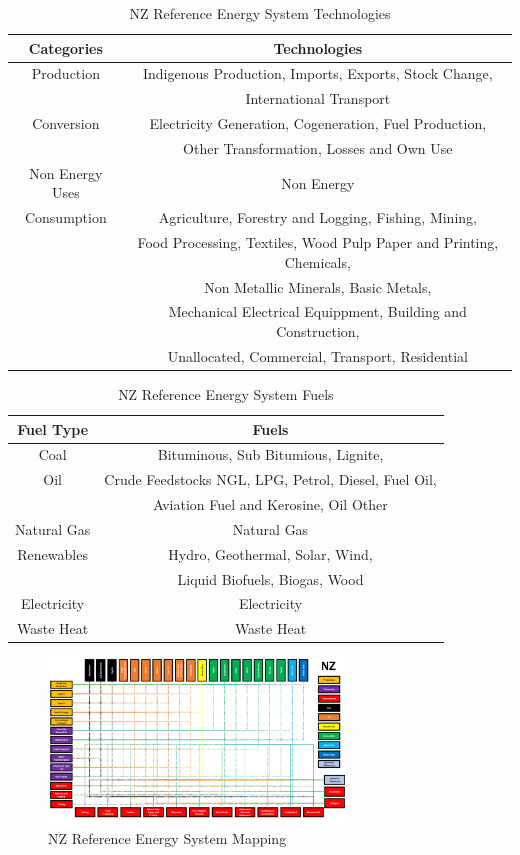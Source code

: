 \documentclass[12pt]{article}
\begin{document}
\begin{table}[H]
	\centering
	\begin{tabular}{||c | c||} 
	 \hline
	 Categories & Technologies \\ [0.5ex] 
	 \hline\hline
	 Production & Indigenous Production, Imports, Exports, Stock Change,\\
	 & International Transport\\ 
	 \hline  
	 Conversion & Electricity Generation, Cogeneration, Fuel Production, \\
	 & Other Transformation, Losses and Own Use\\
	 \hline
	 Non Energy Uses & Non Energy \\
	 \hline
	 Consumption& Agriculture, Forestry and Logging, Fishing, Mining, \\
	 &Food Processing, Textiles, Wood Pulp Paper and Printing, Chemicals,\\
	 &Non Metallic Minerals, Basic Metals,\\
	 &Mechanical Electrical Equippment, Building and Construction,\\
	 &Unallocated, Commercial, Transport, Residential\\
	 \hline
	\end{tabular}
	\caption{NZ Reference Energy System Technologies}
	\label{table:2}
\end{table}
\begin{table}[H]
	\centering
	\begin{tabular}{||c | c||} 
	 \hline
	 Fuel Type & Fuels \\ [0.5ex] 
	 \hline\hline
	 Coal & Bituminous, Sub Bitumious, Lignite,\\
	 \hline
	 Oil & Crude Feedstocks NGL, LPG, Petrol, Diesel, Fuel Oil,\\
	 & Aviation Fuel and Kerosine, Oil Other\\
	 \hline
	 Natural Gas & Natural Gas\\
	 \hline 
	 Renewables & Hydro, Geothermal, Solar, Wind, \\
	 & Liquid Biofuels, Biogas, Wood\\
	 \hline
	 Electricity & Electricity\\
	 \hline
	 Waste Heat & Waste Heat\\
	 \hline
	\end{tabular}
	\caption{NZ Reference Energy System Fuels}
	\label{table:3}
\end{table}
\begin{figure}[H]
    \centering
    \includegraphics[width = 0.7\textwidth]{NZRES.png}
	\caption{NZ Reference Energy System Mapping}
	\label{fig:NZRES}%
\end{figure}
\end{document}
